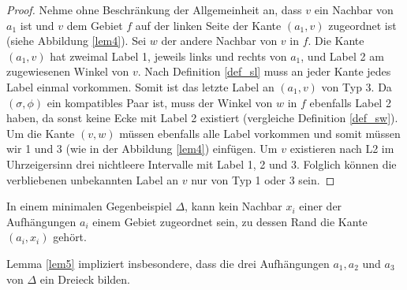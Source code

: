 \begin{proof}
Nehme ohne Beschränkung der Allgemeinheit an, dass $v$ ein Nachbar von $a_1$ ist und $v$ dem Gebiet $f$ auf der linken Seite der Kante $(a_1,v)$ zugeordnet ist (siehe Abbildung \ref{lem4}). Sei $w$ der andere Nachbar von $v$ in $f$. Die Kante $(a_1,v)$ hat zweimal Label 1, jeweils links und rechts von $a_1$, und Label 2 am zugewiesenen Winkel von $v$. Nach Definition \ref{def_sl} muss an jeder Kante jedes Label einmal vorkommen. Somit ist das letzte Label an $(a_1,v)$ von Typ 3. Da $(\sigma,\phi)$ ein kompatibles Paar ist, muss der Winkel von $w$ in $f$ ebenfalls Label 2 haben, da sonst keine Ecke mit Label 2 existiert (vergleiche Definition \ref{def_sw}). Um die Kante $(v,w)$ müssen ebenfalls alle Label vorkommen und somit müssen wir 1 und 3 (wie in der Abbildung \ref{lem4}) einfügen. Um $v$ existieren nach L2 im Uhrzeigersinn drei nichtleere Intervalle mit Label 1, 2 und 3. Folglich können die verbliebenen unbekannten Label an $v$ nur von Typ 1 oder 3 sein.
\end{proof}

\begin{lemma}\label{lem5}
In einem minimalen Gegenbeispiel $\Delta$, kann kein Nachbar $x_i$ einer der Aufhängungen $a_i$ einem Gebiet zugeordnet sein, zu dessen Rand die Kante $(a_i,x_i)$ gehört.
\end{lemma}

\begin{remark}
Lemma \ref{lem5} impliziert insbesondere, dass die drei Aufhängungen $a_1,a_2$ und $a_3$ von $\Delta$ ein Dreieck bilden.
\end{remark}

